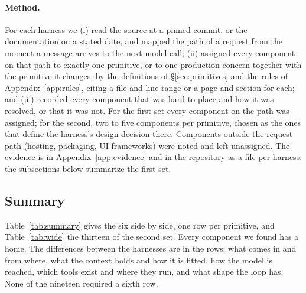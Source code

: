 \paragraph{Method.} For each harness we (i) read the source at a pinned commit, or the documentation on a stated date, and mapped the path of a request from the moment a message arrives to the next model call; (ii) assigned every component on that path to exactly one primitive, or to one production concern together with the primitive it changes, by the definitions of \S\ref{sec:primitives} and the rules of Appendix~\ref{app:rules}, citing a file and line range or a page and section for each; and (iii) recorded every component that was hard to place and how it was resolved, or that it was not. For the first set every component on the path was assigned; for the second, two to five components per primitive, chosen as the ones that define the harness's design decision there. Components outside the request path (hosting, packaging, UI frameworks) were noted and left unassigned. The evidence is in Appendix~\ref{app:evidence} and in the repository as a file per harness; the subsections below summarize the first set.



\subsection{Summary}
\label{sec:summary}
Table~\ref{tab:summary} gives the six side by side, one row per primitive, and Table~\ref{tab:wide} the thirteen of the second set. Every component we found has a home. The differences between the harnesses are in the rows: what comes in and from where, what the context holds and how it is fitted, how the model is reached, which tools exist and where they run, and what shape the loop has. None of the nineteen required a sixth row.




